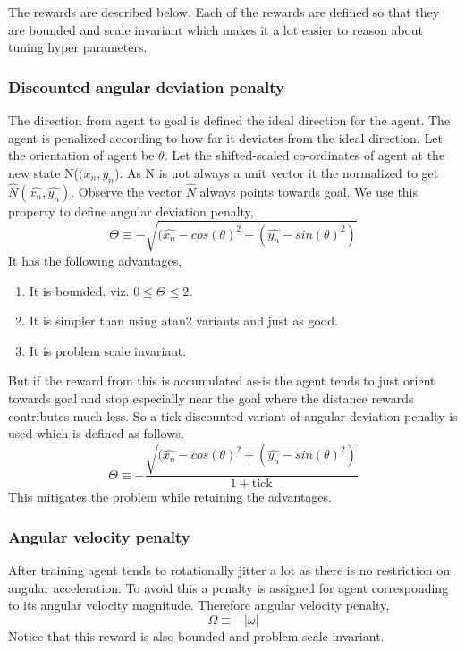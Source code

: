\documentclass[12pt]{article}
\begin{document}
The rewards are described below. Each of the rewards are defined so that they are bounded and scale invariant which makes it a lot easier to reason about tuning hyper parameters.

\subsubsection{Discounted angular deviation penalty}
The direction from agent to goal is defined the ideal direction for the agent.
The agent is penalized according to how far it deviates from the ideal direction.
Let the orientation of agent be $\theta$.
Let the shifted-scaled co-ordinates of agent at the new state N($(x_n, y_n$).
As N is not always a unit vector it the normalized to get $\hat{N}(\hat{x_n}, \hat{y_n})$.
Observe the vector $\hat{N}$ always points towards goal.
We use this property to define angular deviation penalty,
\[
    \Theta \equiv -\sqrt{(\hat{x_n} - cos(\theta)^2 + (\hat{y_n} - sin(\theta)^2)}
\]
It has the following advantages,
\begin{enumerate}[nolistsep]
    \item It is bounded. viz. $0 \le \Theta \le 2$.
    \item It is simpler than using atan2 variants and just as good.
    \item It is problem scale invariant.
\end{enumerate}

But if the reward from this is accumulated as-is the agent tends to just orient towards goal and stop especially near the goal where the distance rewards contributes much less. So a tick discounted variant of angular deviation penalty is used which is defined as follows,
\[
    \Theta \equiv -\frac{\sqrt{(\hat{x_n} - cos(\theta)^2 + (\hat{y_n} - sin(\theta)^2)}}{1 + \text{tick}}
\]
This mitigates the problem while retaining the advantages.

\subsubsection{Angular velocity penalty}
After training agent tends to rotationally jitter a lot as there is no restriction on angular acceleration.
To avoid this a penalty is assigned for agent corresponding to its angular velocity magnitude.
Therefore angular velocity penalty,
\[
    \Omega \equiv -|\omega|
\]
Notice that this reward is also bounded and problem scale invariant.
\end{document}
